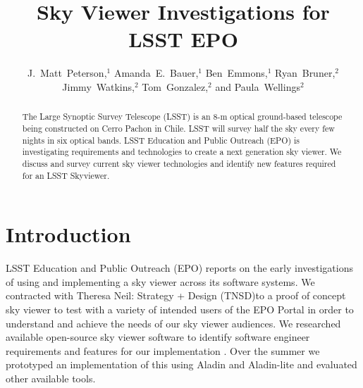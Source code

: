\documentclass[11pt,twoside]{article}
\begin{document}
\title{Sky Viewer Investigations for LSST EPO}

\author{J.~Matt~Peterson,$^1$ Amanda~E.~Bauer,$^1$ Ben~Emmons,$^1$ Ryan~Bruner,$^2$ Jimmy~Watkins,$^2$ Tom~Gonzalez,$^2$ and Paula~Wellings$^2$}


\begin{abstract}
The Large Synoptic Survey Telescope (LSST) is an 8-m optical ground-based telescope being constructed on Cerro Pachon in Chile. LSST will survey half the sky every few nights in six optical bands. LSST Education and Public Outreach (EPO) is investigating requirements and technologies to create a next generation sky viewer. We discuss and survey current sky viewer technologies and identify new features required for an LSST Skyviewer.
\end{abstract}

\section{Introduction}
LSST Education and Public Outreach (EPO) reports on the early investigations of using and implementing a sky viewer across its software systems. We contracted with Theresa Neil: Strategy + Design (TNSD)\footnotemark[1] to a proof of concept sky viewer to test with a variety of intended users of the EPO Portal in order to understand and achieve the needs of our sky viewer audiences. We researched available open-source sky viewer software to identify software engineer requirements and features for our implementation \citep{2017LSST.1.LSE-89,2017LSST.1.LEP-31}. Over the summer we prototyped an implementation of this using Aladin and Aladin-lite \citep{2014ASPC..485..277B} and evaluated other available tools.
\end{document}
